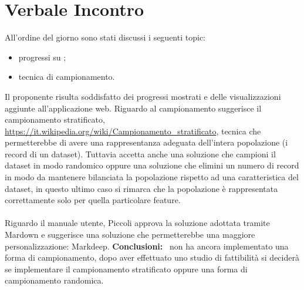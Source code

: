 \section{Verbale Incontro}
All'ordine del giorno sono stati discussi i seguenti topic:
\begin{itemize}
    \item progressi su \hd ;
    \item tecnica di campionamento.
\end{itemize}
Il proponente risulta soddisfatto dei progressi mostrati e delle visualizzazioni aggiunte all'applicazione web. Riguardo al campionamento suggerisce il campionamento stratificato, \url{https://it.wikipedia.org/wiki/Campionamento_stratificato}, tecnica che permetterebbe di avere una rappresentanza adeguata dell'intera popolazione (i record di un dataset). Tuttavia accetta anche una soluzione che campioni il dataset in modo randomico oppure una soluzione che elimini un numero di record in modo da mantenere bilanciata la popolazione rispetto ad una caratteristica del dataset, in questo ultimo caso si rimarca che la popolazione è rappresentata correttamente solo per quella particolare feature.
\\ \\ 
\noindent
Riguardo il manuale utente, Piccoli approva la soluzione adottata tramite Mardown e suggerisce una soluzione che permetterebbe una maggiore personalizzazione: Markdeep.
\noindent \textbf{Conclusioni:}
\cod\ non ha ancora implementato una forma di campionamento, dopo aver effettuato uno studio di fattibilità si deciderà se implementare il campionamento stratificato oppure una forma di campionamento randomica.